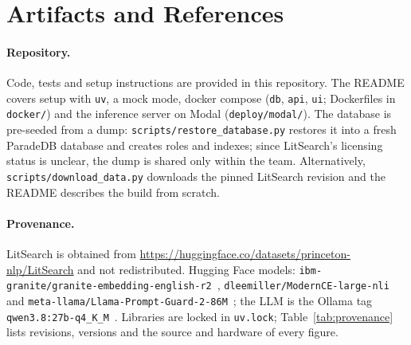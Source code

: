 \section{Artifacts and References}
\label{sec:artifacts}

\paragraph{Repository.}
Code, tests and setup instructions are provided in this repository.
The README covers setup with \texttt{uv}, a mock mode, docker compose (\texttt{db}, \texttt{api}, \texttt{ui}; Dockerfiles in \texttt{docker/}) and the inference server on Modal (\texttt{deploy/modal/}).
The database is pre-seeded from a dump: \texttt{scripts/restore\_database.py} restores it into a fresh ParadeDB database and creates roles and indexes; since LitSearch's licensing status is unclear, the dump is shared only within the team.
Alternatively, \texttt{scripts/download\_data.py} downloads the pinned LitSearch revision and the README describes the build from scratch.

\paragraph{Provenance.}
LitSearch is obtained from \url{https://huggingface.co/datasets/princeton-nlp/LitSearch} and not redistributed.
Hugging Face models: \nolinkurl{ibm-granite/granite-embedding-english-r2}~\cite{hf_granite}, \nolinkurl{dleemiller/ModernCE-large-nli}~\cite{hf_modernce} and \nolinkurl{meta-llama/Llama-Prompt-Guard-2-86M}~\cite{hf_promptguard}; the LLM is the Ollama tag \texttt{qwen3.8:27b-q4\_K\_M}~\cite{ollama_qwen38}.
Libraries are locked in \texttt{uv.lock}; Table~\ref{tab:provenance} lists revisions, versions and the source and hardware of every figure.
